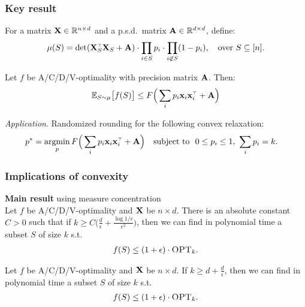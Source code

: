 \documentclass[10pt]{beamer}
\begin{document}
\begin{frame}
  \frametitle{Key result}
  For a matrix $\mathbf X\in\mathbb R^{n\times d}$ and a p.s.d.~matrix
  $\mathbf A\in\mathbb R^{d\times d}$, define:
  \begin{align*}
    \mu(S)=\det(\X_S^\top\X_S+\A)\cdot\prod_{i\in
    S}p_i\cdot\prod_{i\not\in S}(1-p_i),
    \quad\text{over }S\subseteq [n].
  \end{align*}
  \pause

  \begin{theorem}
  Let $f$ be A/C/D/V-optimality with precision matrix $\mathbf A$. Then:
  \begin{align*}
    \E_{S\sim\mu}\big[f(S)\big] \leq F\Big(\sum_ip_i\x_i\x_i^\top + \A\Big)
  \end{align*}
\end{theorem}
\vspace{5mm}
\pause

\emph{Application}. Randomized rounding for the following convex
relaxation:
\begin{align*}
  p^*
  &= \argmin_p F\Big(\sum_ip_i\x_i\x_i^\top+\A\Big)
\quad\text{subject to }\ 0\leq p_i\leq 1,\ \sum_ip_i=k.
\end{align*}
\end{frame}

\begin{frame}
  \frametitle{Implications of convexity}
  \textbf{Main result} using measure concentration\\[2mm]
    Let $f$ be A/C/D/V-optimality and $\mathbf X$ be $n\times d$. There is an absolute
    constant $C>0$ such that if
  $k\geq C\big(\frac{d}{\epsilon} +
  \frac{\log1/\epsilon}{\epsilon^2}\big)$, then 
we can find in polynomial time a subset $S$ of size $k$ s.t.
  \begin{align*}
    f(S) \leq (1+\epsilon)\cdot{\textsc{OPT}_k}.
  \end{align*}
  \pause
  
  \begin{theorem}
    Let $f$ be A/C/D/V-optimality and $\mathbf X$ be $n\times d$. If
  $k\geq d+\frac{d}{\epsilon}$, then 
we can find in polynomial time a subset $S$ of size $k$ s.t.
  \begin{align*}
    f(S) \leq (1+\epsilon)\cdot{\textsc{OPT}_k}.
  \end{align*}    
  \end{theorem}
  
\end{frame}
\end{document}

